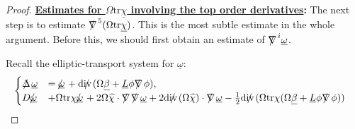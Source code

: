 \documentclass[11pt,reqno]{amsart}
\theoremstyle{definition}
\numberwithin{equation}{section}
\newcommand{\tr}{\mathrm{tr}}
\renewcommand{\L}{\mathbb{L}}
\renewcommand{\H}{\mathbb{H}}
\def\betab{\underline{\beta}}
\def\chib{\underline{\chi}}
\def\chibh{\widehat{\underline{\chi}}}
\def\chih{\widehat{\chi}}
\def\etab{\underline{\eta}}
\def\Lb{\underline{L}}
\def\tr{\mathrm{tr}}
\def\omegab{\underline{\omega}}
\def\ub{\underline{u}}
\def\nablas{\mbox{$\nabla \mkern -13mu /$ }}
\def\Deltas{\mbox{$\Delta \mkern -13mu /$ }}
\def\divs{\mbox{$\mathrm{div} \mkern -13mu /$ }}
\def\omegabs{\mbox{$\omegab \mkern -13mu /$ }}
\def\ds{\mbox{$\nabla \mkern -13mu /$ }}
\begin{document}
\begin{proof}
{\bf \underline{Estimates for $\Omega\tr\chib$ involving the top order derivatives}:} The next step is to estimate $\nablas^5(\Omega\tr\chib)$. This is the most subtle estimate in the whole argument. Before this, we should first obtain an estimate of $\nablas^i\omegab$.
\begin{comment}
 the lower order ones of which are estimated through the equation
\begin{equation}\label{equ-Domegab}
D  \omegab =\Omega^2(2(\eta,\etab)-|\eta|^2-|\ds\phi|^2+K)+\frac{1}{4}\Omega\tr \chi\Omega\tr\chib-\frac{1}{2}(\Omega\chih,\Omega\chibh)+L\phi\Lb\phi.
\end{equation}
The right hand side should be estimated in $\delta\|\cdot\|_{\L^1_{\ub}\H^4(u)}$. First of all, the first three terms are estimated by
\begin{align*}
\lesssim \delta\cdot C^{\frac{1}{4}}\delta|u|^{-2}\mathscr{F}\mathscr{E}\mathcal{A}\cdot C^{\frac{1}{4}}\delta|u|^{-2}\mathscr{F}\mathscr{E}\mathscr{W}^{\frac{1}{2}}\mathcal{A}\lesssim C^{-1}\delta|u|^{-2}\mathscr{F}\mathcal{A}.
\end{align*}
The Gauss curvature term is estimated similarly as in \eqref{estimate-K2}, by $\Omega_0\delta\|K\|_{\L^2_{\ub}\H^4(u)}\lesssim|u|^{-2}\mathscr{F}\mathcal{A}$. The next two terms are estimated by also $\lesssim\delta|u|^{-2}\mathscr{F}\mathcal{A}$. Using also the estimate for $L\phi$, \eqref{estimate-Lphi}, we have
\begin{align*}
\|\omegab\|_{\H^4(\ub,u)}\lesssim\delta|u|^{-2}\mathscr{F}\mathcal{A}+\delta|u|^{-1}\mathscr{F}\mathcal{A}\|\Lb\phi\|_{\L^1_{\ub}\H^4(u)}.
\end{align*}
We should estimate the above inequality in $\||u|^{\frac{3}{2}}\cdot\|_{\L^1_{[u_0,u]}\H^4(\ub)}$, by, using \eqref{estimate-Lbphi1},
\begin{equation}\label{estimate-omegab-lower}
\||u|^{\frac{3}{2}}\omegab\|_{\L^1_{[u_0,u]}\H^4(\ub)}\lesssim\delta|u|^{-\frac{1}{2}}\mathscr{F}\mathscr{W}^{\frac{1}{2}}\mathcal{A}.
\end{equation}
\end{comment}
Recall the elliptic-transport system for $\omegab$:
\begin{align*}
&\begin{cases}\Deltas\omegab&=\omegabs+\divs(\Omega\betab+\Lb\phi\nablas\phi),\\
D\omegabs&+\Omega\tr\chi\omegabs+2\Omega\chih\cdot\nablas\nablas\omegab+2\divs(\Omega\chih)\cdot\nablas\omegab-\frac{1}{2}\divs(\Omega\tr\chi(\Omega\betab+\Lb\phi\nablas\phi))\\

\end{cases}
\end{align*}
\end{proof}
\end{document}
